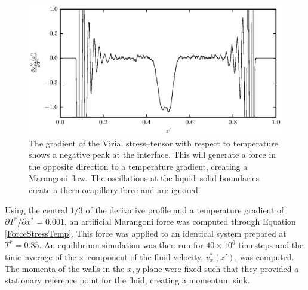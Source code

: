 \begin{figure}[h]
\centering
\includegraphics[scale=0.8]{PisVirForce}
\caption{The gradient of the Virial stress--tensor with respect to temperature shows a negative peak at the interface.
This will generate a force in the opposite direction to a temperature gradient, creating a Marangoni flow.
The oscillations at the liquid--solid boundaries create a thermocapillary force and are ignored.}
\label{PisVirForce}
\end{figure}
\FloatBarrier

Using the central $1/3$ of the derivative profile and a temperature gradient of $\partial T^{*} / \partial x^{*} = 0.001$, an artificial Marangoni force was computed through Equation \ref{ForceStressTemp}.
This force was applied to an identical system prepared at $T^{*} = 0.85$.
An equilibrium simulation was then run for $40 \times 10^{6}$ timesteps and the time--average of the x--component of the fluid velocity, $v^{*}_{x}(z')$, was computed.
The momenta of the walls in the $x,y$ plane were fixed such that they provided a stationary reference point for the fluid, creating a momentum sink.

